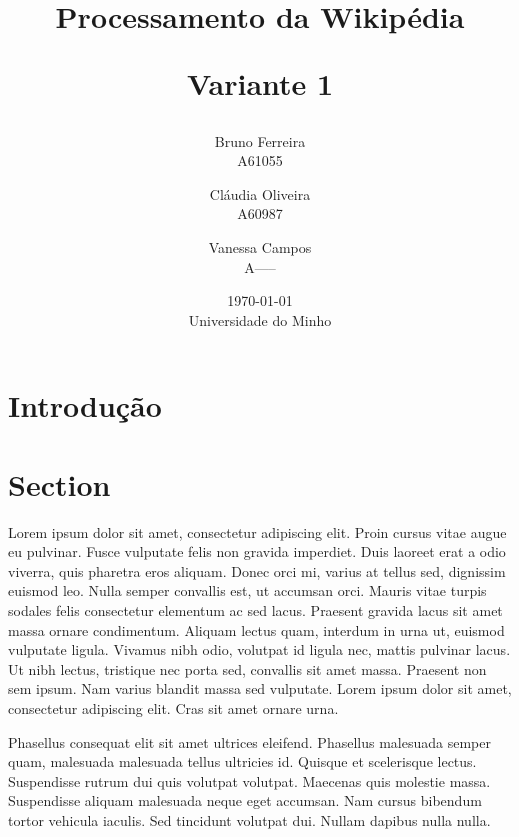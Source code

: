 \documentclass[11pt, a4paper, oneside]{article}
\begin{document}
\title{Processamento da Wikipédia\\
\begin{normalsize}
Variante 1
\end{normalsize}}
\date{\today\\Universidade do Minho}
\author{
  Bruno Ferreira\\
  {\small A61055}\\
  \and
  Cláudia Oliveira\\
  {\small A60987}\\
  \and
  Vanessa Campos\\
  {\small A-----}\\
}

\maketitle
\newpage

\tableofcontents
\listoffigures 

\newpage
\section{Introdução}



\newpage
\section{Section}

Lorem ipsum dolor sit amet, consectetur adipiscing elit. Proin cursus vitae augue eu pulvinar. Fusce vulputate felis non gravida imperdiet. Duis laoreet erat a odio viverra, quis pharetra eros aliquam. Donec orci mi, varius at tellus sed, dignissim euismod leo. Nulla semper convallis est, ut accumsan orci. Mauris vitae turpis sodales felis consectetur elementum ac sed lacus. Praesent gravida lacus sit amet massa ornare condimentum. Aliquam lectus quam, interdum in urna ut, euismod vulputate ligula. Vivamus nibh odio, volutpat id ligula nec, mattis pulvinar lacus. Ut nibh lectus, tristique nec porta sed, convallis sit amet massa. Praesent non sem ipsum. Nam varius blandit massa sed vulputate. Lorem ipsum dolor sit amet, consectetur adipiscing elit. Cras sit amet ornare urna.

Phasellus consequat elit sit amet ultrices eleifend. Phasellus malesuada semper quam, malesuada malesuada tellus ultricies id. Quisque et scelerisque lectus. Suspendisse rutrum dui quis volutpat volutpat. Maecenas quis molestie massa. Suspendisse aliquam malesuada neque eget accumsan. Nam cursus bibendum tortor vehicula iaculis. Sed tincidunt volutpat dui. Nullam dapibus nulla nulla.
\end{document}
